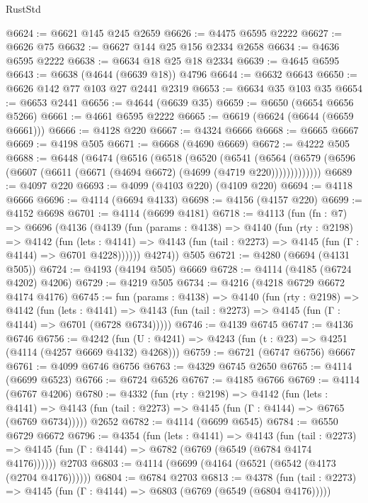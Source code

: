 \begin{lexlean}{RustStd}
\begin{coremodule}
@6624 := @6621 @145 @245 @2659
@6626 := @4475 @6595 @2222
@6627 := @6626 @75
@6632 := @6627 @144 @25 @156 @2334 @2658
@6634 := @4636 @6595 @2222
@6638 := @6634 @18 @25 @18 @2334
@6639 := @4645 @6595
@6643 := @6638 (@4644 (@6639 @18)) @4796
@6644 := @6632 @6643
@6650 := @6626 @142 @77 @103 @27 @2441 @2319
@6653 := @6634 @35 @103 @35
@6654 := @6653 @2441
@6656 := @4644 (@6639 @35)
@6659 := @6650 (@6654 @6656 @5266)
@6661 := @4661 @6595 @2222
@6665 := @6619 (@6624 (@6644 (@6659 @6661)))
@6666 := @4128 @220
@6667 := @4324 @6666
@6668 := @6665 @6667
@6669 := @4198 @505
@6671 := @6668 (@4690 @6669)
@6672 := @4222 @505
@6688 := @6448
    (@6474
      (@6516
        (@6518
          (@6520
            (@6541
              (@6564
                (@6579 (@6596 (@6607 (@6611 (@6671 (@4694 @6672) (@4699 (@4719 @220)))))))))))))
@6689 := @4097 @220
@6693 := @4099 (@4103 @220) (@4109 @220)
@6694 := @4118 @6666
@6696 := @4114 (@6694 @4133)
@6698 := @4156 (@4157 @220)
@6699 := @4152 @6698
@6701 := @4114 (@6699 @4181)
@6718 := @4113
    (fun (fn : @7) =>
    @6696
      (@4136
        (@4139
          (fun (params : @4138) =>
          @4140
            (fun (rty : @2198) =>
            @4142
              (fun (lets : @4141) =>
              @4143 (fun (tail : @2273) => @4145 (fun (Γ : @4144) => @6701 @4228))))))
        @4274))
    @505
@6721 := @4280 (@6694 (@4131 @505))
@6724 := @4193 (@4194 @505) @6669
@6728 := @4114 (@4185 (@6724 @4202) @4206)
@6729 := @4219 @505
@6734 := @4216 (@4218 @6729 @6672 @4174 @4176)
@6745 := fun (params : @4138) =>
  @4140
    (fun (rty : @2198) =>
    @4142
      (fun (lets : @4141) =>
      @4143 (fun (tail : @2273) => @4145 (fun (Γ : @4144) => @6701 (@6728 @6734)))))
@6746 := @4139 @6745
@6747 := @4136 @6746
@6756 := @4242 (fun (U : @4241) => @4243 (fun (t : @23) => @4251 (@4114 (@4257 @6669 @4132) @4268)))
@6759 := @6721 (@6747 @6756) @6667
@6761 := @4099 @6746 @6756
@6763 := @4329 @6745 @2650
@6765 := @4114 (@6699 @6523)
@6766 := @6724 @6526
@6767 := @4185 @6766
@6769 := @4114 (@6767 @4206)
@6780 := @4332
    (fun (rty : @2198) =>
    @4142
      (fun (lets : @4141) =>
      @4143 (fun (tail : @2273) => @4145 (fun (Γ : @4144) => @6765 (@6769 @6734)))))
    @2652
@6782 := @4114 (@6699 @6545)
@6784 := @6550 @6729 @6672
@6796 := @4354
    (fun (lets : @4141) =>
    @4143
      (fun (tail : @2273) => @4145 (fun (Γ : @4144) => @6782 (@6769 (@6549 (@6784 @4174 @4176))))))
    @2703
@6803 := @4114 (@6699 (@4164 (@6521 (@6542 (@4173 (@2704 @4176))))))
@6804 := @6784 @2703
@6813 := @4378
    (fun (tail : @2273) => @4145 (fun (Γ : @4144) => @6803 (@6769 (@6549 (@6804 @4176)))))

\end{coremodule}
\end{lexlean}
